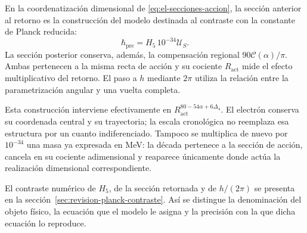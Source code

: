 En la coordenatización dimensional de \eqref{eq:el-secciones-accion}, la sección
anterior al retorno es la construcción del modelo destinada al contraste
con la constante de Planck reducida:
\[
 \hbar_{\mathrm{pre}}=H_5\,10^{-34}\mathcal U_S.
\]
La sección posterior conserva, además, la compensación regional
\(90\mathscr C(\alpha)/\pi\). Ambas pertenecen a la misma recta de
acción y su cociente \(R_{\mathrm{act}}\) mide el efecto multiplicativo
del retorno. El paso a \(h\) mediante \(2\pi\) utiliza la relación
entre la parametrización angular y una vuelta completa.

Esta construcción interviene efectivamente en
\(R_{\mathrm{act}}^{80-54\alpha+6\Delta_4}\). El electrón conserva
su coordenada central y su trayectoria; la escala cronológica no
reemplaza esa estructura por un cuanto indiferenciado. Tampoco se
multiplica de nuevo por \(10^{-34}\) una masa ya expresada en MeV:
la década pertenece a la sección de acción, cancela en su cociente
adimensional y reaparece únicamente donde actúa la realización
dimensional correspondiente.

El contraste numérico de \(H_5\), de la sección retornada y de
\(h/(2\pi)\) se presenta en la sección~\ref{sec:revision-planck-contraste}.
Así se distingue la denominación del objeto físico, la ecuación que el
modelo le asigna y la precisión con la que dicha ecuación lo reproduce.
